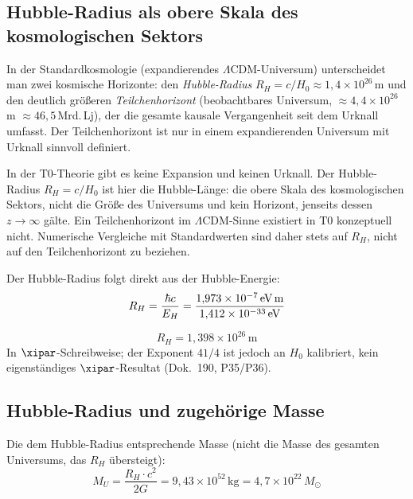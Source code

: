 \subsection{Hubble-Radius als obere Skala des kosmologischen Sektors}

\begin{foundation}
In der Standardkosmologie (expandierendes $\Lambda$CDM-Universum) unterscheidet man zwei kosmische Horizonte: den \textit{Hubble-Radius} $R_H = c/H_0 \approx 1{,}4 \times 10^{26}$\,m und den deutlich größeren \textit{Teilchenhorizont} (beobachtbares Universum, $\approx 4{,}4 \times 10^{26}$\,m $\approx 46{,}5$\,Mrd.\,Lj), der die gesamte kausale Vergangenheit seit dem Urknall umfasst. Der Teilchenhorizont ist nur in einem expandierenden Universum mit Urknall sinnvoll definiert.

In der T0-Theorie gibt es keine Expansion und keinen Urknall. Der Hubble-Radius $R_H = c/H_0$ ist hier die Hubble-Länge: die obere Skala des kosmologischen Sektors, nicht die Größe des Universums und kein Horizont, jenseits dessen $z \to \infty$ gälte. Ein Teilchenhorizont im $\Lambda$CDM-Sinne existiert in T0 konzeptuell nicht. Numerische Vergleiche mit Standardwerten sind daher stets auf $R_H$, nicht auf den Teilchenhorizont zu beziehen.
\end{foundation}

Der Hubble-Radius folgt direkt aus der Hubble-Energie:
\begin{equation}
	R_H = \frac{\hbar c}{E_H} = \frac{1{,}973 \times 10^{-7}\,\text{eV\,m}}{1{,}412 \times 10^{-33}\,\text{eV}}
\end{equation}

\begin{keyresult}
\begin{equation}
	\boxed{R_H = 1{,}398 \times 10^{26}\,\text{m}}
\end{equation}
In $\xipar$-Schreibweise; der Exponent $41/4$ ist jedoch an $H_0$ kalibriert, kein eigenständiges $\xipar$-Resultat (Dok.~190, P35/P36).
\end{keyresult}

\subsection{Hubble-Radius und zugehörige Masse}

Die dem Hubble-Radius entsprechende Masse (nicht die Masse des gesamten Universums, das $R_H$ übersteigt):
\begin{equation}
	M_U = \frac{R_H \cdot c^2}{2G} = 9{,}43 \times 10^{52}\,\text{kg} = 4{,}7 \times 10^{22}\,M_\odot
\end{equation}

